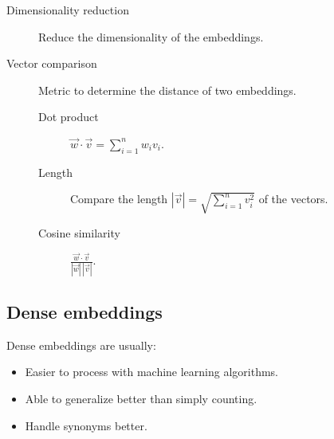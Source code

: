 \begin{description}
    \item[Dimensionality reduction] 
        Reduce the dimensionality of the embeddings.

    \item[Vector comparison] 
        Metric to determine the distance of two embeddings.

        \begin{description}
            \item[Dot product] $\vec{w} \cdot \vec{v} = \sum_{i=1}^{n} w_i v_i$.
            \item[Length] Compare the length $|\vec{v}| = \sqrt{\sum_{i=1}^{n} v_i^2}$ of the vectors.
            \item[Cosine similarity] $\frac{\vec{w} \cdot \vec{v}}{|\vec{w}| \, |\vec{v}|}$.
        \end{description}
\end{description}


\subsection{Dense embeddings}

\begin{remark}
    Dense embeddings are usually:
    \begin{itemize}
        \item Easier to process with machine learning algorithms.
        \item Able to generalize better than simply counting.
        \item Handle synonyms better.
    \end{itemize}
\end{remark}

